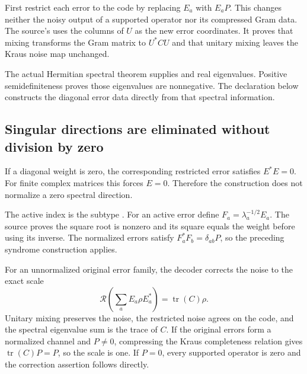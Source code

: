 
First restrict each error to the code by replacing $E_a$ with $E_aP$. This changes neither the noisy output of a supported operator nor its compressed Gram data. The source's  uses the columns of $U$ as the new error coordinates. It proves that mixing transforms the Gram matrix to $U^*CU$ and that unitary mixing leaves the Kraus noise map unchanged.

The actual Hermitian spectral theorem supplies  and real eigenvalues. Positive semidefiniteness proves those eigenvalues are nonnegative. The declaration below constructs the diagonal error data directly from that spectral information.



\subsection{Singular directions are eliminated without division by zero}
If a diagonal weight is zero, the corresponding restricted error satisfies $E^*E=0$. For finite complex matrices this forces $E=0$. Therefore the construction does not normalize a zero spectral direction.


The active index is the subtype . For an active error define $F_a=\lambda_a^{-1/2}E_a$. The source proves the square root is nonzero and its square equals the weight before using its inverse. The normalized errors satisfy $F_a^*F_b=\delta_{ab}P$, so the preceding syndrome construction applies.

For an unnormalized original error family, the decoder corrects the noise to the exact scale
\[
\mathcal R\!\left(\sum_aE_a\rho E_a^*\right)=\operatorname{tr}(C)\rho.
\]
Unitary mixing preserves the noise, the restricted noise agrees on the code, and the spectral eigenvalue sum is the trace of $C$. If the original errors form a normalized channel and $P\ne0$, compressing the Kraus completeness relation gives $\operatorname{tr}(C)P=P$, so the scale is one. If $P=0$, every supported operator is zero and the correction assertion follows directly.

